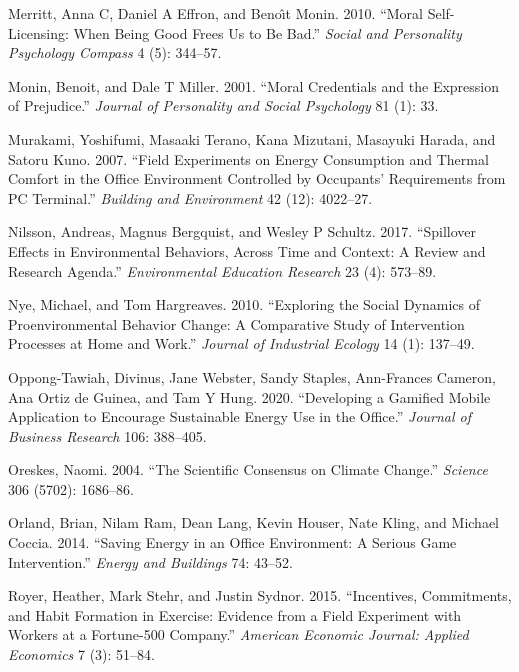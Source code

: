 \documentclass[
  12pt,
  captions=heading]{scrreport}
\newlength{\cslhangindent}
\newlength{\cslentryspacingunit} %
\newenvironment{CSLReferences}[2] %
 {%
  \setlength{\parindent}{0pt}
  \ifodd #1
  \let\oldpar\par
  \def\par{\hangindent=\cslhangindent\oldpar}
  \fi
  \setlength{\parskip}{#2\cslentryspacingunit}
 }%
 {}
\begin{document}
\begin{CSLReferences}{1}{0}
\leavevmode{}%
Merritt, Anna C, Daniel A Effron, and Benoı̂t Monin. 2010. {``Moral
Self-Licensing: When Being Good Frees Us to Be Bad.''} \emph{Social and
Personality Psychology Compass} 4 (5): 344--57.

\leavevmode{}%
Monin, Benoit, and Dale T Miller. 2001. {``Moral Credentials and the
Expression of Prejudice.''} \emph{Journal of Personality and Social
Psychology} 81 (1): 33.

\leavevmode{}%
Murakami, Yoshifumi, Masaaki Terano, Kana Mizutani, Masayuki Harada, and
Satoru Kuno. 2007. {``Field Experiments on Energy Consumption and
Thermal Comfort in the Office Environment Controlled by Occupants'
Requirements from PC Terminal.''} \emph{Building and Environment} 42
(12): 4022--27.

\leavevmode{}%
Nilsson, Andreas, Magnus Bergquist, and Wesley P Schultz. 2017.
{``Spillover Effects in Environmental Behaviors, Across Time and
Context: A Review and Research Agenda.''} \emph{Environmental Education
Research} 23 (4): 573--89.

\leavevmode{}%
Nye, Michael, and Tom Hargreaves. 2010. {``Exploring the Social Dynamics
of Proenvironmental Behavior Change: A Comparative Study of Intervention
Processes at Home and Work.''} \emph{Journal of Industrial Ecology} 14
(1): 137--49.

\leavevmode{}%
Oppong-Tawiah, Divinus, Jane Webster, Sandy Staples, Ann-Frances
Cameron, Ana Ortiz de Guinea, and Tam Y Hung. 2020. {``Developing a
Gamified Mobile Application to Encourage Sustainable Energy Use in the
Office.''} \emph{Journal of Business Research} 106: 388--405.

\leavevmode{}%
Oreskes, Naomi. 2004. {``The Scientific Consensus on Climate Change.''}
\emph{Science} 306 (5702): 1686--86.

\leavevmode{}%
Orland, Brian, Nilam Ram, Dean Lang, Kevin Houser, Nate Kling, and
Michael Coccia. 2014. {``Saving Energy in an Office Environment: A
Serious Game Intervention.''} \emph{Energy and Buildings} 74: 43--52.

\leavevmode{}%
Royer, Heather, Mark Stehr, and Justin Sydnor. 2015. {``Incentives,
Commitments, and Habit Formation in Exercise: Evidence from a Field
Experiment with Workers at a Fortune-500 Company.''} \emph{American
Economic Journal: Applied Economics} 7 (3): 51--84.


\end{CSLReferences}
\end{document}

